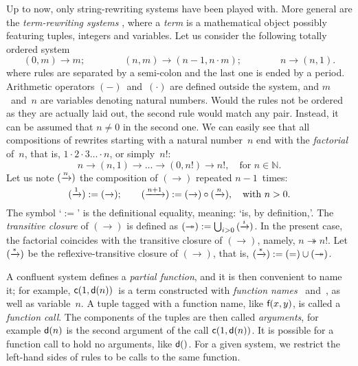 Up to now, only string\hyp{}rewriting systems have been played
with. More general are the \emph{term\hyp{}rewriting
  systems} \citep{BaaderNipkow_1998}, where a
\emph{term} is a mathematical object possibly featuring
tuples, integers and variables. Let us consider the following totally
ordered system
\begin{equation}
(0,m) \rightarrow m;\qquad\qquad
(n,m) \rightarrow (n-1,n \cdot m);\qquad\qquad
n     \rightarrow (n,1).
\label{eq:fact_tf}
\end{equation}
where rules are separated by a semi\hyp{}colon and the last one is
ended by a period. Arithmetic operators \((-)\)~and~\((\cdot)\) are
defined outside the system, and \(m\)~and~\(n\) are variables denoting
natural numbers. Would the rules not be ordered as they are actually
laid out, the second rule would match any pair. Instead, it can be
assumed that \(n \neq 0\) in the second one. We can easily see that
all compositions of rewrites starting with a natural number~\(n\) end
with the \emph{factorial} of~\(n\), that is, \(1
\cdot 2 \cdot 3 \dots \cdot n\), or simply~\(n!\):
\begin{equation*}
n \rightarrow (n,1) \rightarrow \dots \rightarrow (0,n!) \rightarrow
n!, \quad \text{for \(n \in \mathbb{N}\)}.
\end{equation*}
Let us note \((\xrightarrow{\smash{n}})\) the composition of
\((\rightarrow)\) repeated \(n-1\)~times:
\begin{equation*}
  (\xrightarrow{\smash{1}})   := (\rightarrow);\qquad
  (\xrightarrow{\smash{n+1}}) :=
     (\rightarrow) \circ (\xrightarrow{\smash{n}}),
\quad \text{with \(n > 0\)}.
\end{equation*}
The symbol `\(:=\)' is the definitional equality, meaning: `is, by
definition,'. The \emph{transitive closure} \label{transitive_closure} of \((\rightarrow)\) is defined
as \((\twoheadrightarrow) := \bigcup_{i >
  0}{(\xrightarrow{\smash{i}})}\). In the present case, the
factorial coincides with the transitive closure of
\((\rightarrow)\), namely, \(n \twoheadrightarrow n!\). Let
\((\xrightarrow{\smash{*}})\) be the reflexive\hyp{}transitive closure
of \((\rightarrow)\), that is, \((\xrightarrow{\smash{*}}) := (=) \cup
(\twoheadrightarrow)\).

A confluent system defines a \emph{partial function}, and it is then
convenient to name it; for example, \(\textsf{c}(1, \textsf{d}(n))\)~is a
term constructed with \emph{function names} ~and~, as
well as variable~\(n\). A tuple tagged with a function name, like
\(\textsf{f}(x,y)\), is called a \emph{function call}. The components of
the tuples are then called \emph{arguments}, for example
\(\textsf{d}(n)\) is the second argument of the call \(\textsf{c}(1,
\textsf{d}(n))\). It is possible for a function call to hold no
arguments, like \(\textsf{d}()\). For a given system, we restrict the
left\hyp{}hand sides of rules to be calls to the same function.

